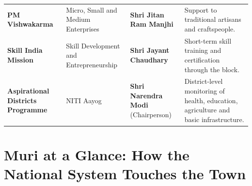 \documentclass[12pt,a4paper,openany]{report}
\begin{document}
{\begin{longtable}{@{}>{\raggedright\arraybackslash}p{3.7cm} >{\raggedright\arraybackslash}p{3.0cm} >{\raggedright\arraybackslash}p{4.1cm} >{\raggedright\arraybackslash}p{3.8cm}@{}}
\addlinespace[2pt]
\textbf{PM Vishwakarma} & Micro, Small and Medium Enterprises & \textbf{Shri Jitan Ram Manjhi} & Support to traditional artisans and craftspeople. \\
\addlinespace[2pt]
\textbf{Skill India Mission} & Skill Development and Entrepreneurship & \textbf{Shri Jayant Chaudhary} & Short-term skill training and certification through the block. \\
\addlinespace[2pt]
\textbf{Aspirational Districts Programme} & NITI Aayog & \textbf{Shri Narendra Modi} (Chairperson) & District-level monitoring of health, education, agriculture and basic infrastructure. \\
\bottomrule
\end{longtable}}

\vspace{3pt}

\newpage
\section*{Muri at a Glance: How the National System Touches the Town}
\end{document}
